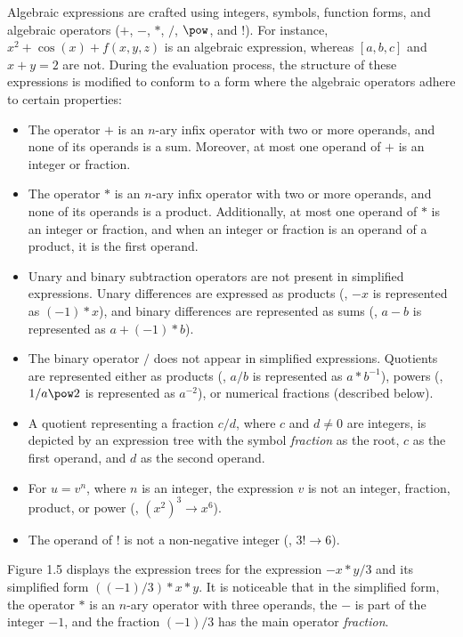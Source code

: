 Algebraic expressions are crafted using integers, symbols, function forms, and algebraic operators ($+$, $-$, $*$, $/$, $\pow$, and $!$). For instance, $x^2+\cos(x)+f(x,y,z)$ is an algebraic expression, whereas $[a,b,c]$ and $x + y = 2$ are not. During the evaluation process, the structure of these expressions is modified to conform to a form where the algebraic operators adhere to certain properties:
%
\begin{itemize}
  \setlength{\itemsep}{0.0em}
  \item The operator $+$ is an $n$-ary infix operator with two or more operands, and none of its operands is a sum. Moreover, at most one operand of $+$ is an integer or fraction.
  \item The operator $*$ is an $n$-ary infix operator with two or more operands, and none of its operands is a product. Additionally, at most one operand of $*$ is an integer or fraction, and when an integer or fraction is an operand of a product, it is the first operand.
  \item Unary and binary subtraction operators are not present in simplified expressions. Unary differences are expressed as products (\eg{}, $-x$ is represented as $(-1)*x$), and binary differences are represented as sums (\eg{}, $a - b$ is represented as $a+(-1)*b$).
  \item The binary operator $/$ does not appear in simplified expressions. Quotients are represented either as products (\eg{}, $a/b$ is represented as $a*b^{-1}$), powers (\eg{}, $1/a\pow2$ is represented as $a^{-2}$), or numerical fractions (described below).
  \item A quotient representing a fraction $c/d$, where $c$ and $d \neq 0$ are integers, is depicted by an expression tree with the symbol \textit{fraction} as the root, $c$ as the first operand, and $d$ as the second operand.
  \item For $u = v^n$, where $n$ is an integer, the expression $v$ is not an integer, fraction, product, or power (\eg{}, $(x^2)^3 \rightarrow x^6$).
  \item The operand of $!$ is not a non-negative integer (\eg{}, $3! \rightarrow 6$).
\end{itemize}

Figure 1.5 displays the expression trees for the expression $-x*y/3$ and its simplified form $((-1)/3)*x*y$. It is noticeable that in the simplified form, the operator $*$ is an $n$-ary operator with three operands, the $-$ is part of the integer $-1$, and the fraction $(-1)/3$ has the main operator \textit{fraction}.

